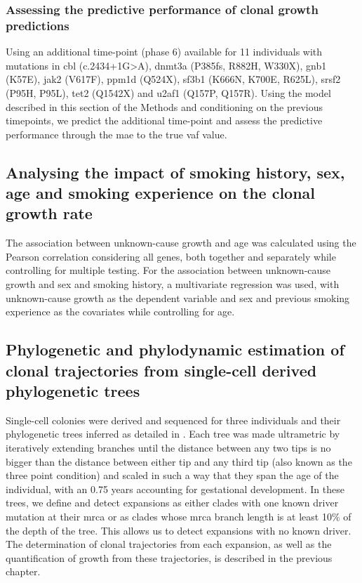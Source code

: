 \subsubsection{Assessing the predictive performance of clonal growth predictions}
Using an additional time-point (phase 6) available for 11 individuals with mutations in \ac{cbl} (c.2434+1G>A), \ac{dnmt3a} (P385fs, R882H, W330X), \ac{gnb1} (K57E), \ac{jak2} (V617F), \ac{ppm1d} (Q524X), \ac{sf3b1} (K666N, K700E, R625L), \ac{srsf2} (P95H, P95L), \ac{tet2} (Q1542X) and \ac{u2af1} (Q157P, Q157R). Using the model described in this section of the Methods and conditioning on the previous timepoints, we predict the additional time-point and assess the predictive performance through the \ac{mae} to the true \ac{vaf} value.

\subsection{Analysing the impact of smoking history, sex, age and smoking experience on the clonal growth rate}

The association between unknown-cause growth and age was calculated using the Pearson correlation considering all genes, both together and separately while controlling for multiple testing. For the association between unknown-cause growth and sex and smoking history, a multivariate regression was used, with unknown-cause growth as the dependent variable and sex and previous smoking experience as the covariates while controlling for age.

\subsection{Phylogenetic and phylodynamic estimation of clonal trajectories from single-cell derived phylogenetic trees}

Single-cell colonies were derived and sequenced for three individuals and their phylogenetic trees inferred as detailed in \cite{Fabre2021-uw}. Each tree was made ultrametric by iteratively extending branches until the distance between any two tips is no bigger than the distance between either tip and any third tip (also known as the three point condition) and scaled in such a way that they span the age of the individual, with an 0.75 years accounting for gestational development. In these trees, we define and detect expansions as either clades with one known driver mutation at their \ac{mrca} or as clades whose \ac{mrca} branch length is at least 10\% of the depth of the tree. This allows us to detect expansions with no known driver. The determination of clonal trajectories from each expansion, as well as the quantification of growth from these trajectories, is described in the previous chapter.

